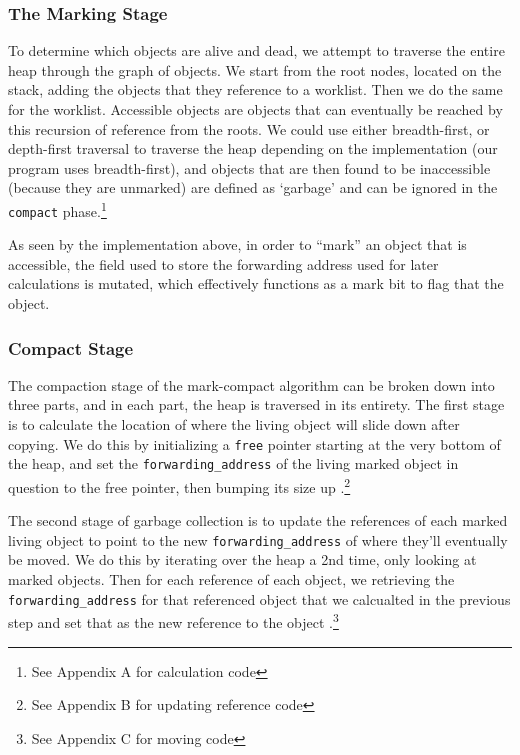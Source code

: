 \documentclass[index]{subfiles}
\begin{document}
\subsubsection{The Marking Stage}

To determine which objects are alive and dead, we attempt to traverse the entire heap through the graph of objects. We start from the root nodes, located on the stack\cites[3..~Marking]{redhat_openjdk}[Chapter~3]{gc_handbook}, adding the objects that they reference to a worklist. Then we do the same for the worklist. Accessible objects are objects that can eventually be reached by this recursion of reference from the roots. We could use either breadth-first, or depth-first traversal to traverse the heap depending on the implementation (our program uses breadth-first), and objects that are then found to be inaccessible (because they are unmarked) are defined as `garbage' and can be ignored in the \verb+compact+ phase.\footnote{See Appendix A for calculation code}

As seen by the implementation above, in order to ``mark'' an object that is accessible, the field used to store the forwarding address used for later calculations is mutated, which effectively functions as a mark bit to flag that the object.\cite[Chapter~1]{gc_handbook}


\subsubsection{Compact Stage}

The compaction stage of the mark-compact algorithm can be broken down into three parts, and in each part, the heap is traversed in its entirety. The first stage is to calculate the location of where the living object will slide down after copying. We do this by initializing a \verb+free+ pointer starting at the very bottom of the heap, and set the \verb+forwarding_address+ of the living marked object in question to the free pointer, then bumping its size up \cites[Chapter~3]{gc_handbook}[Sections~3.3--3.5]{redhat_openjdk}.\footnote{See Appendix B for updating reference code}


The second stage of garbage collection is to update the references of each marked living object to point to the new \verb+forwarding_address+ of where they'll eventually be moved. We do this by iterating over the heap a 2nd time, only looking at marked objects. Then for each reference of each object, we retrieving the \verb+forwarding_address+ for that referenced object that we calcualted in the previous step and set that as the new reference to the object \cites[Chapter 3]{gc_handbook}[Sec.~3.4]{redhat_openjdk}.\footnote{See Appendix C for moving code}
\end{document}
